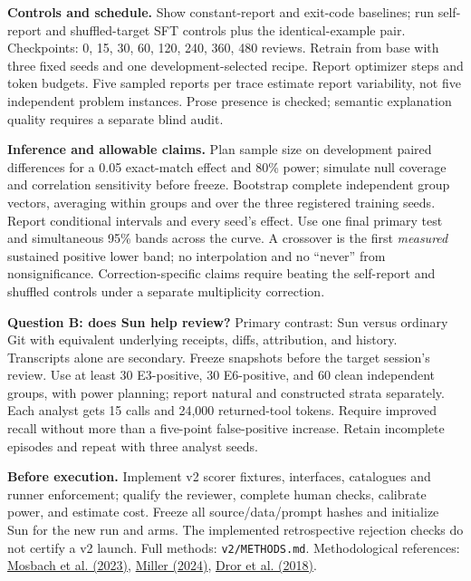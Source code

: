 \documentclass[10pt,letterpaper]{article}
\begin{document}
\textbf{Controls and schedule.} Show constant-report and exit-code baselines;
run self-report and shuffled-target SFT controls plus the identical-example
pair. Checkpoints: 0, 15, 30, 60, 120, 240, 360, 480 reviews. Retrain from base
with three fixed seeds and one development-selected recipe. Report optimizer
steps and token budgets. Five sampled reports per trace estimate report
variability, not five independent problem instances. Prose presence is checked;
semantic explanation quality requires a separate blind audit.

\textbf{Inference and allowable claims.} Plan sample size on development paired
differences for a 0.05 exact-match effect and 80\% power; simulate null coverage
and correlation sensitivity before freeze. Bootstrap complete independent
group vectors, averaging within groups and over the three registered training
seeds. Report conditional intervals and every seed's effect. Use one final
primary test and simultaneous 95\% bands across the curve. A crossover is the
first \emph{measured} sustained positive lower band; no interpolation and no
``never'' from nonsignificance. Correction-specific claims require beating the
self-report and shuffled controls under a separate multiplicity correction.

\textbf{Question B: does Sun help review?} Primary contrast: Sun versus ordinary
Git with equivalent underlying receipts, diffs, attribution, and history.
Transcripts alone are secondary. Freeze snapshots before the target session's
review. Use at least 30 E3-positive, 30 E6-positive, and 60 clean independent
groups, with power planning; report natural and constructed strata separately.
Each analyst gets 15 calls and 24,000 returned-tool tokens. Require improved
recall without more than a five-point false-positive increase. Retain incomplete
episodes and repeat with three analyst seeds.

{\footnotesize\textbf{Before execution.} Implement v2 scorer fixtures, interfaces,
catalogues and runner enforcement; qualify the reviewer, complete human checks,
calibrate power, and estimate cost. Freeze all source/data/prompt hashes and
initialize Sun for the new run and arms. The implemented retrospective rejection
checks do not certify a v2 launch. Full methods: \texttt{v2/METHODS.md}.
Methodological references:
\href{https://arxiv.org/abs/2305.16938}{Mosbach et al. (2023)},
\href{https://arxiv.org/abs/2411.00640}{Miller (2024)},
\href{https://aclanthology.org/P18-1128/}{Dror et al. (2018)}.}
\end{document}
